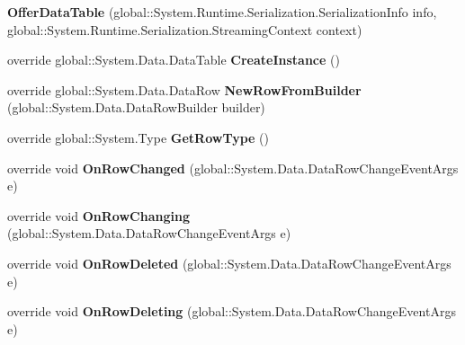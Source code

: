 \begin{DoxyCompactItemize}
\item 
{\bfseries Offer\+Data\+Table} (global\+::\+System.\+Runtime.\+Serialization.\+Serialization\+Info info, global\+::\+System.\+Runtime.\+Serialization.\+Streaming\+Context context)\hypertarget{class_products_1_1_data_1_1ds_sage_1_1_offer_data_table_aa17a21c8f41f165121a51626798dd396}{}\label{class_products_1_1_data_1_1ds_sage_1_1_offer_data_table_aa17a21c8f41f165121a51626798dd396}

\item 
override global\+::\+System.\+Data.\+Data\+Table {\bfseries Create\+Instance} ()\hypertarget{class_products_1_1_data_1_1ds_sage_1_1_offer_data_table_a3f03c6010cc4e8b82a88e713b9c239d2}{}\label{class_products_1_1_data_1_1ds_sage_1_1_offer_data_table_a3f03c6010cc4e8b82a88e713b9c239d2}

\item 
override global\+::\+System.\+Data.\+Data\+Row {\bfseries New\+Row\+From\+Builder} (global\+::\+System.\+Data.\+Data\+Row\+Builder builder)\hypertarget{class_products_1_1_data_1_1ds_sage_1_1_offer_data_table_a938c26c6ff08dfc966159c2192318070}{}\label{class_products_1_1_data_1_1ds_sage_1_1_offer_data_table_a938c26c6ff08dfc966159c2192318070}

\item 
override global\+::\+System.\+Type {\bfseries Get\+Row\+Type} ()\hypertarget{class_products_1_1_data_1_1ds_sage_1_1_offer_data_table_a75c644e1135b57c5c02004e55b0f57c0}{}\label{class_products_1_1_data_1_1ds_sage_1_1_offer_data_table_a75c644e1135b57c5c02004e55b0f57c0}

\item 
override void {\bfseries On\+Row\+Changed} (global\+::\+System.\+Data.\+Data\+Row\+Change\+Event\+Args e)\hypertarget{class_products_1_1_data_1_1ds_sage_1_1_offer_data_table_a5cabb34cba41bb45b0cc0f2809b756f9}{}\label{class_products_1_1_data_1_1ds_sage_1_1_offer_data_table_a5cabb34cba41bb45b0cc0f2809b756f9}

\item 
override void {\bfseries On\+Row\+Changing} (global\+::\+System.\+Data.\+Data\+Row\+Change\+Event\+Args e)\hypertarget{class_products_1_1_data_1_1ds_sage_1_1_offer_data_table_a9398324de7971e3811a80d244edfa15b}{}\label{class_products_1_1_data_1_1ds_sage_1_1_offer_data_table_a9398324de7971e3811a80d244edfa15b}

\item 
override void {\bfseries On\+Row\+Deleted} (global\+::\+System.\+Data.\+Data\+Row\+Change\+Event\+Args e)\hypertarget{class_products_1_1_data_1_1ds_sage_1_1_offer_data_table_a7356d9bba6a95dffcba173ac9257b0f5}{}\label{class_products_1_1_data_1_1ds_sage_1_1_offer_data_table_a7356d9bba6a95dffcba173ac9257b0f5}

\item 
override void {\bfseries On\+Row\+Deleting} (global\+::\+System.\+Data.\+Data\+Row\+Change\+Event\+Args e)\hypertarget{class_products_1_1_data_1_1ds_sage_1_1_offer_data_table_ad747ad4419855ada0459611ef37f5276}{}\label{class_products_1_1_data_1_1ds_sage_1_1_offer_data_table_ad747ad4419855ada0459611ef37f5276}

\end{DoxyCompactItemize}
